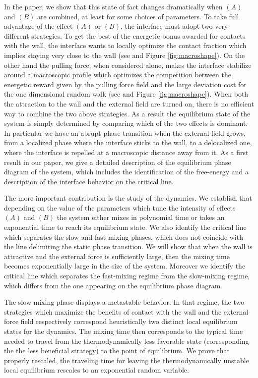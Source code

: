 \documentclass[reqno,11pt]{amsart}
\numberwithin{equation}{section}
\begin{document}
In the paper, we show that this state of fact changes dramatically when $(A)$ and $(B)$ are combined, at least for some choices of parameters.
To take full advantage of the effect $(A)$ or $(B)$, the interface must adopt two very different strategies.
To get the best of the energetic bonus awarded for contacts with the wall, the interface wants to locally optimize the contact fraction which implies staying very close to the wall (see   \cite[Theorem 2.4]{GiacominPolymerbk} and Figure \ref{fig:macroshape}). On the other hand the pulling force, when considered alone, makes the interface stabilize around a macroscopic profile which optimizes the competition between the energetic reward given by the pulling force field and the large deviation cost for the one dimensional random walk (see  \cite[Theorem 4]{LabbeWABridge} and Figure \ref{fig:macroshape}). When both the attraction to the wall and the external field are turned on, there is no efficient way to combine the two above strategies. As a result the equilibrium state of the system is simply determined by comparing which of the two effects is dominant. In particular we have an abrupt phase transition when the external field grows, from a localized phase where the interface sticks to the wall, to a delocalized one, where the interface is repelled at a macroscopic distance away from  it. 
As a first result in our paper, we give a detailed description of the equilibrium phase diagram of the system, which includes the identification of the free-energy and a description of the interface behavior on the critical line.  

\medskip

The more important contribution is the study of the dynamics. We establish that depending on the value of the parameters which tune the intensity of effects $(A)$ and $(B)$ the system either mixes in polynomial time or takes an exponential time to reach its equilibrium state. We also identify the critical line which separates the slow and fast mixing phases, which does not coincide with the line delimiting the static phase transition. 
We will show that when the wall is attractive and the external force is sufficiently large, then the mixing time becomes exponentially large in the size of the system.
Moreover we identify the critical line which separates the fast-mixing regime from the slow-mixing regime, which differs from the one appearing on the equilibrium phase diagram.

\medskip

The slow mixing phase displays a metastable behavior. In that regime, the two strategies which maximize the benefits of contact with the wall and the external force field respectively correspond heuristically two distinct local equilibrium states for the dynamics. The mixing time then corresponds to the typical time needed to travel from the thermodynamically  less favorable state (corresponding the the less beneficial strategy)
to the point of equilibrium. We prove that properly rescaled, the traveling time for leaving the thermodynamically unstable local equilibrium rescales to an exponential random variable.
\end{document}

